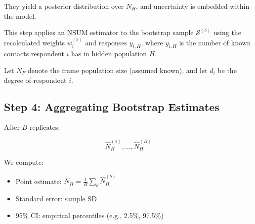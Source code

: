 \documentclass[
  12pt,
  letterpaper,
  DIV=11,
  numbers=noendperiod]{scrartcl}
\theoremstyle{plain}
\theoremstyle{definition}
\begin{document}
They yield a posterior distribution over \(N_H\), and uncertainty is
embedded within the model.

This step applies an NSUM estimator to the bootstrap sample
\(\mathcal{S}^{(b)}\) using the recalculated weights \(w_i^{(b)}\) and
responses \(y_{i,H}\), where \(y_{i,H}\) is the number of known contacts
respondent \(i\) has in hidden population \(H\).

Let \(N_F\) denote the frame population size (assumed known), and let
\(d_i\) be the degree of respondent \(i\).

\subsection{Step 4: Aggregating Bootstrap
Estimates}\label{step-4-aggregating-bootstrap-estimates}

After \(B\) replicates:

\[\hat{N}_H^{(1)}, \dots, \hat{N}_H^{(B)}\]

We compute:

\begin{itemize}
\item
  Point estimate: \(\bar{N}_H = \frac{1}{B} \sum_b \hat{N}_H^{(b)}\)
\item
  Standard error: sample SD
\item
  95\% CI: empirical percentiles (e.g., 2.5\%, 97.5\%)
\end{itemize}
\end{document}
